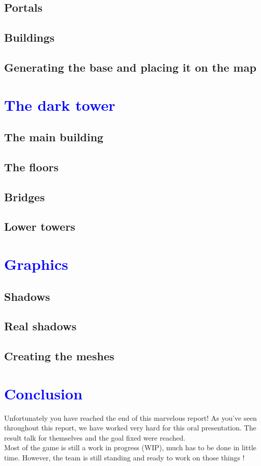 \documentclass[article]{report}             %
\begin{document}
			\section{Portals}
			\section{Buildings}
			\section{Generating the base and placing it on the map}

		\chapter{\textcolor{blue}{The dark tower}}
			\section{The main building}
			\section{The floors}
			\section{Bridges}
			\section{Lower towers}
		\chapter{\textcolor{blue}{Graphics}}
			\section{Shadows}
			\section{Real shadows}
			\section{Creating the meshes}
		
		\chapter{\textcolor{blue}{Conclusion}}
			Unfortunately you have reached the end of this marvelous report! As you've seen throughout this report, we have worked very hard for this oral presentation. The result talk for themselves and the goal fixed were reached.\\
			
			Most of the game is still a work in progress (WIP), much has to be done in little time. However, the team is still standing and ready to work on those things !
			
			
\end{document}
